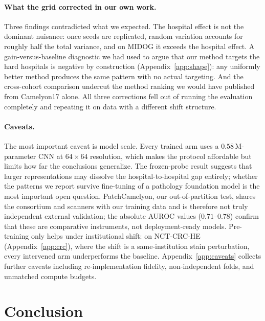 \documentclass[10pt]{article} %
\begin{document}
\paragraph{What the grid corrected in our own work.}
Three findings contradicted what we expected. The hospital effect is not the
dominant nuisance: once seeds are replicated, random variation accounts for
roughly half the total variance, and on MIDOG it exceeds the hospital effect.
A gain-versus-baseline diagnostic we had used to argue that our method targets
the hard hospitals is negative by construction (Appendix~\ref{app:shape}): any
uniformly better method produces the same pattern with no actual targeting.
And the cross-cohort comparison undercut the method ranking we would have
published from Camelyon17 alone. All three corrections fell out of running the
evaluation completely and repeating it on data with a different shift structure.

\paragraph{Caveats.}
The most important caveat is model scale. Every trained arm uses a $0.58$\,M-parameter
CNN at $64\times64$ resolution, which makes the protocol affordable but limits
how far the conclusions generalize. The frozen-probe result suggests that
larger representations may dissolve the hospital-to-hospital gap entirely;
whether the patterns we report survive fine-tuning of a pathology foundation
model \citep{chen2024uni} is the most important open question. PatchCamelyon,
our out-of-partition test, shares the consortium and scanners with our training
data and is therefore not truly independent external validation; the absolute
AUROC values ($0.71$--$0.78$) confirm that these are comparative instruments,
not deployment-ready models. Pre-training only helps under institutional shift:
on NCT-CRC-HE (Appendix~\ref{app:crc}), where the shift is a
same-institution stain perturbation, every intervened arm underperforms the
baseline. Appendix~\ref{app:caveats} collects further caveats including
re-implementation fidelity, non-independent folds, and unmatched compute
budgets.

\section{Conclusion}
\end{document}
